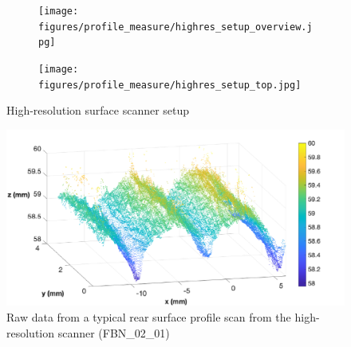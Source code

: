 \documentclass[12pt]{report}
\begin{document}
\begin{figure}[ht]
    \begin{subfigure}{0.5\textwidth}
        \centering
        \texttt{[image: figures/profile\_measure/highres\_setup\_overview.jpg]}  
        \label{fig:highres_setup_front}
    \end{subfigure}
    \begin{subfigure}{0.5\textwidth}
        \centering
        \texttt{[image: figures/profile\_measure/highres\_setup\_top.jpg]}  
        \label{fig:highres_setup_top}
    \end{subfigure}
    \caption{High-resolution surface scanner setup}
    \label{fig:highres_setup}
\end{figure}

\begin{figure}
    \centering
    \includegraphics[width=\textwidth]{figures/profile_measure/typical_scatter.pdf}
    \caption{Raw data from a typical rear surface profile scan from the high-resolution scanner (FBN\_02\_01)}
    \label{fig:typical_scatter}
\end{figure}
\end{document}
